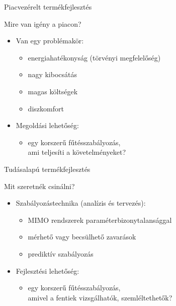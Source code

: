 \documentclass[14pt,handout]{beamer}
\begin{document}
\begin{frame}{Piacvezérelt termékfejlesztés}

Mire van igény a piacon?

\begin{itemize}
	\setlength{\itemsep}{7pt}
	\item Van egy problémakör:
	\begin{itemize}
		\item energiahatékonyság (törvényi megfelelőség)
		\item nagy kibocsátás
		\item magas költségek
		\item diszkomfort
	\end{itemize}
	\pause
	
	\item Megoldási lehetőség:
	\begin{itemize}
		\item egy korszerű fűtésszabályozás,\\
		ami teljesíti a követelményeket?
	\end{itemize}
\end{itemize}
\end{frame}



\begin{frame}{Tudásalapú termékfejlesztés}

Mit szeretnék csinálni?
\pause
\vspace{6pt}

\begin{itemize}
	\setlength{\itemsep}{12pt}
	\item Szabályozástechnika (analízis és tervezés):
	\begin{itemize}
		\item MIMO rendszerek paraméterbizonytalansággal
		\item mérhető vagy becsülhető zavarások
		\item prediktív szabályozás
	\end{itemize}
	\pause

	\item Fejlesztési lehetőség:
	\begin{itemize}
		\item egy korszerű fűtésszabályozás, \\
		amivel a fentiek vizsgálhatók, szemléltethetők?
	\end{itemize}
\end{itemize}
\end{frame}
\end{document}
